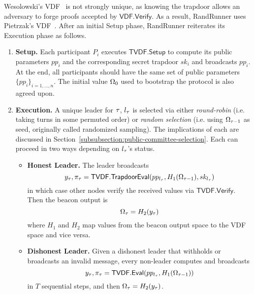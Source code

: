 Wesolowski's VDF~\cite{wesolowski2019efficient} is not strongly unique, as knowing the trapdoor allows an adversary to forge proofs accepted by $\mathsf{VDF.Verify}$. As a result, RandRunner uses Pietrzak's VDF~\cite{pietrzak2018simple}. After an initial Setup phase, RandRunner reiterates its Execution phase as follows.
\begin{enumerate}
    \item \textbf{Setup.} Each participant $P_i$ executes $\mathsf{TVDF.Setup}$ to compute its public parameters $pp_i$ and the corresponding secret trapdoor $sk_i$ and broadcasts $pp_i$. At the end, all participants should have the same set of public parameters $\{pp_i\}_{i = 1, ..., n}$. The initial value $\Omega_0$ used to bootstrap the protocol is also agreed upon.
    \item \textbf{Execution.} A unique leader for \epoch $\tau$, $l_\tau$ is selected via either \textit{round-robin} (i.e. taking turns in some permuted order) or \textit{random selection} (i.e. using $\Omega_{\tau - 1}$ as seed, originally called randomized sampling). The implications of each are discussed in Section~\ref{subsubsection:public-committee-selection}. Each \epoch can proceed in two ways depending on $l_\tau$'s status.
    \begin{itemize}
        \item \textbf{Honest Leader.} The leader broadcasts
        $$y_\tau, \pi_\tau = \mathsf{TVDF.TrapdoorEval}(pp_{l_\tau}, H_1(\Omega_{\tau - 1}), sk_{l_\tau})$$
        in which case other nodes verify the received values via $\mathsf{TVDF.Verify}$. Then the beacon output is
        $$\Omega_\tau = H_2(y_\tau)$$
        where $H_1$ and $H_2$ map values from the beacon output space to the VDF space and vice versa.
        \item \textbf{Dishonest Leader.} Given a dishonest leader that withholds or broadcasts an invalid message, every non-leader computes and broadcasts
        $$y_\tau, \pi_\tau = \mathsf{TVDF.Eval}(pp_{l_\tau}, H_1(\Omega_{\tau - 1}))$$
        in $T$ sequential steps, and then $\Omega_\tau = H_2(y_\tau)$.
    \end{itemize}
\end{enumerate}

